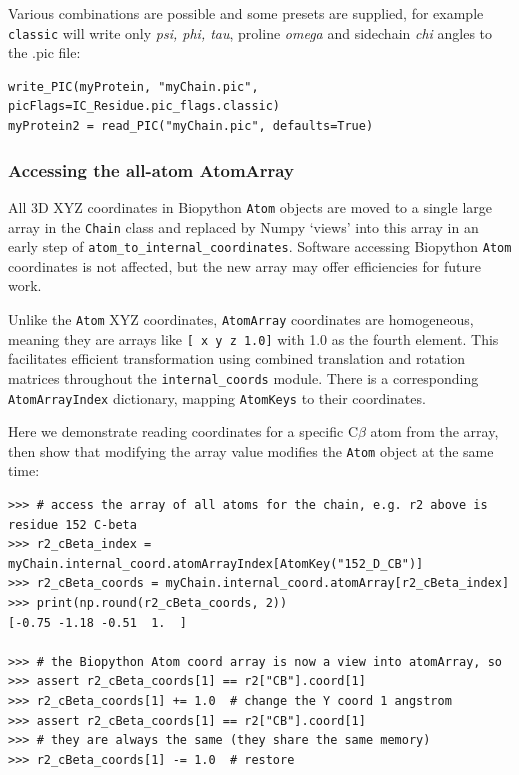 Various combinations are possible and some presets are supplied, for example \texttt{classic}
will write only \textit{psi, phi, tau}, proline \textit{omega} and sidechain \textit{chi}
angles to the .pic file:

\begin{verbatim}
write_PIC(myProtein, "myChain.pic", picFlags=IC_Residue.pic_flags.classic)
myProtein2 = read_PIC("myChain.pic", defaults=True)
\end{verbatim}

\subsubsection{Accessing the all-atom AtomArray}

All 3D XYZ coordinates in Biopython \texttt{Atom} objects are moved to a single large array
in the \texttt{Chain} class and replaced by Numpy `views' into this array in an early step of
\texttt{atom\_to\_internal\_coordinates\(\)}.  Software accessing Biopython \texttt{Atom} coordinates
is not affected, but the new array may offer efficiencies for future work.  

Unlike the \texttt{Atom} XYZ coordinates, \texttt{AtomArray} coordinates are homogeneous, meaning
they are arrays like \texttt{[ x y z 1.0]} with 1.0 as the fourth element.  This facilitates efficient transformation using combined
translation and rotation matrices throughout the \texttt{internal\_coords} module.  There is a 
corresponding \texttt{AtomArrayIndex} dictionary, mapping \texttt{AtomKeys} to their coordinates.

Here we demonstrate reading coordinates for a specific C$\beta$ atom from the array, then show
that modifying the array value modifies the \texttt{Atom} object at the same time:

\begin{verbatim}
>>> # access the array of all atoms for the chain, e.g. r2 above is residue 152 C-beta
>>> r2_cBeta_index = myChain.internal_coord.atomArrayIndex[AtomKey("152_D_CB")]
>>> r2_cBeta_coords = myChain.internal_coord.atomArray[r2_cBeta_index]
>>> print(np.round(r2_cBeta_coords, 2))
[-0.75 -1.18 -0.51  1.  ]

>>> # the Biopython Atom coord array is now a view into atomArray, so
>>> assert r2_cBeta_coords[1] == r2["CB"].coord[1]
>>> r2_cBeta_coords[1] += 1.0  # change the Y coord 1 angstrom
>>> assert r2_cBeta_coords[1] == r2["CB"].coord[1]
>>> # they are always the same (they share the same memory)
>>> r2_cBeta_coords[1] -= 1.0  # restore
\end{verbatim}

